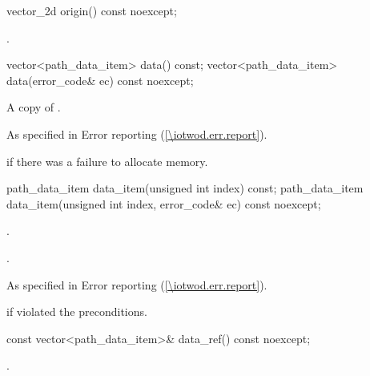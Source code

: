 \begin{itemdecl}
    vector_2d origin() const noexcept;
\end{itemdecl}
\begin{itemdescr}
	\pnum
	\returns
	.

\end{itemdescr}

\begin{itemdecl}
    vector<path_data_item> data() const;
    vector<path_data_item> data(error_code& ec) const noexcept;
\end{itemdecl}
\begin{itemdescr}
	\pnum
	\returns
	A copy of .

	\pnum
	\throws
	As specified in Error reporting (\ref{\iotwod.err.report}).

	\pnum
	\errors
	 if there was a failure to allocate memory.
	
\end{itemdescr}

\begin{itemdecl}
    path_data_item data_item(unsigned int index) const;
    path_data_item data_item(unsigned int index, error_code& ec) const noexcept;
\end{itemdecl}
\begin{itemdescr}
	\pnum
	\preconditions
	.
	
	\pnum
	\returns
	.
	
	\pnum
	\throws
	As specified in Error reporting (\ref{\iotwod.err.report}).

	\pnum
	\errors
	 if  violated the preconditions.

\end{itemdescr}

\begin{itemdecl}
    const vector<path_data_item>& data_ref() const noexcept;
\end{itemdecl}
\begin{itemdescr}
	\pnum
	\returns
	.

\end{itemdescr}
